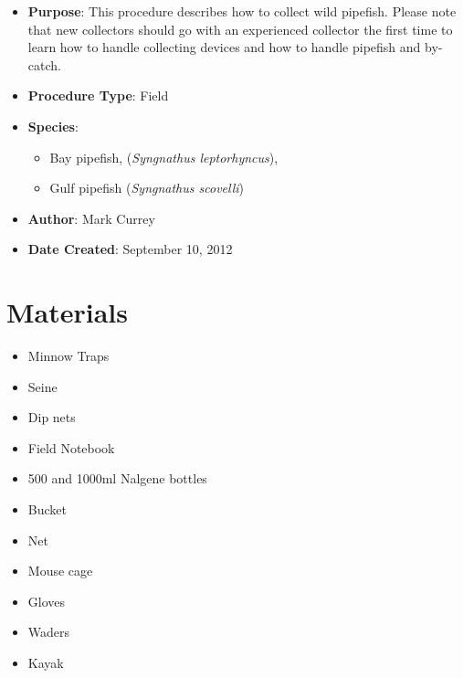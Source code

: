 \documentclass[
  letterpaper,
  DIV=11,
  numbers=noendperiod]{scrreprt}
\providecommand{\tightlist}{%
  \setlength{\itemsep}{0pt}\setlength{\parskip}{0pt}}\usepackage{longtable,booktabs,array}
\begin{document}
\begin{itemize}
\tightlist
\item
  \textbf{Purpose}: This procedure describes how to collect wild
  pipefish. Please note that new collectors should go with an
  experienced collector the first time to learn how to handle collecting
  devices and how to handle pipefish and by-catch.
\item
  \textbf{Procedure Type}: Field
\item
  \textbf{Species}:

  \begin{itemize}
  \tightlist
  \item
    Bay pipefish, (\emph{Syngnathus leptorhyncus}),
  \item
    Gulf pipefish (\emph{Syngnathus scovelli})
  \end{itemize}
\item
  \textbf{Author}: Mark Currey
\item
  \textbf{Date Created}: September 10, 2012
\end{itemize}

\hypertarget{materials-63}{%
\section{Materials}\label{materials-63}}

\begin{itemize}
\tightlist
\item
  Minnow Traps
\item
  Seine
\item
  Dip nets
\item
  Field Notebook
\item
  500 and 1000ml Nalgene bottles
\item
  Bucket
\item
  Net
\item
  Mouse cage
\item
  Gloves
\end{itemize}

\begin{tcolorbox}[enhanced jigsaw, rightrule=.15mm, title=\textcolor{quarto-callout-warning-color}{\faExclamationTriangle}\hspace{0.5em}{OPTIONAL}, titlerule=0mm, opacitybacktitle=0.6, toprule=.15mm, bottomrule=.15mm, opacityback=0, left=2mm, colframe=quarto-callout-warning-color-frame, breakable, coltitle=black, colback=white, colbacktitle=quarto-callout-warning-color!10!white, bottomtitle=1mm, leftrule=.75mm, toptitle=1mm, arc=.35mm]

\begin{itemize}
\tightlist
\item
  Waders
\item
  Kayak
\end{itemize}

\end{tcolorbox}
\end{document}
